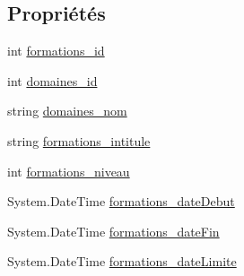 \subsection*{Propriétés}
\begin{DoxyCompactItemize}
\item 
int \hyperlink{classforma_1_1formadb_data_set_1_1view__formations__domaines_row_a9580092993404f1bae2fa732db67f84b}{formations\+\_\+id}
\item 
int \hyperlink{classforma_1_1formadb_data_set_1_1view__formations__domaines_row_a678b1490d6d04a35edc598cb996542f3}{domaines\+\_\+id}
\item 
string \hyperlink{classforma_1_1formadb_data_set_1_1view__formations__domaines_row_a9b49692bae05b90cfcf8d7b90c245399}{domaines\+\_\+nom}
\item 
string \hyperlink{classforma_1_1formadb_data_set_1_1view__formations__domaines_row_a8a38ffc9562dbdf6734a98de359b12ff}{formations\+\_\+intitule}
\item 
int \hyperlink{classforma_1_1formadb_data_set_1_1view__formations__domaines_row_a7dfe0d93d95de74464fae89262e975ba}{formations\+\_\+niveau}
\item 
System.\+Date\+Time \hyperlink{classforma_1_1formadb_data_set_1_1view__formations__domaines_row_a83b771d44f032a6dd41f618f9f161a67}{formations\+\_\+date\+Debut}
\item 
System.\+Date\+Time \hyperlink{classforma_1_1formadb_data_set_1_1view__formations__domaines_row_af560d8f8f2220add3ec53b2f34cc4081}{formations\+\_\+date\+Fin}
\item 
System.\+Date\+Time \hyperlink{classforma_1_1formadb_data_set_1_1view__formations__domaines_row_a596bb2083feaba72dbb79dc0739cb39e}{formations\+\_\+date\+Limite}
\end{DoxyCompactItemize}


